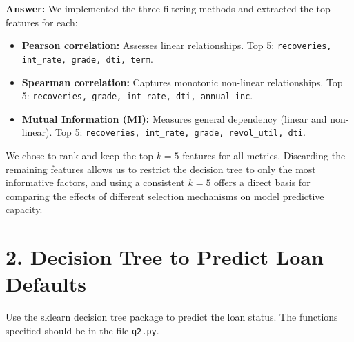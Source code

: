 \documentclass[11pt]{article}
\begin{document}
\begin{enumerate}[label=(\alph*)]
    \textbf{Answer:} We implemented the three filtering methods and extracted the top features for each:
    \begin{itemize}
        \item \textbf{Pearson correlation:} Assesses linear relationships. Top 5: \texttt{recoveries, int\_rate, grade, dti, term}.
        \item \textbf{Spearman correlation:} Captures monotonic non-linear relationships. Top 5: \texttt{recoveries, grade, int\_rate, dti, annual\_inc}.
        \item \textbf{Mutual Information (MI):} Measures general dependency (linear and non-linear). Top 5: \texttt{recoveries, int\_rate, grade, revol\_util, dti}.
    \end{itemize}
    We chose to rank and keep the top $k=5$ features for all metrics. Discarding the remaining features allows us to restrict the decision tree to only the most informative factors, and using a consistent $k=5$ offers a direct basis for comparing the effects of different selection mechanisms on model predictive capacity.
\end{enumerate}

\section*{2. Decision Tree to Predict Loan Defaults}

Use the sklearn decision tree package to predict the loan status. The functions specified should be in the file \texttt{q2.py}.
\end{document}

